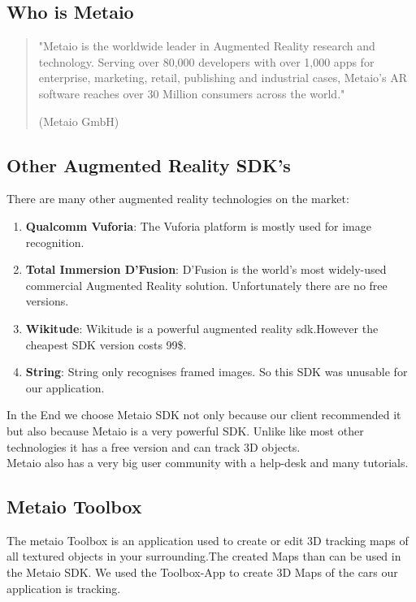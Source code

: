 \subsection{Who is Metaio}
\begin{quotation}
"Metaio is the worldwide leader in Augmented Reality research and technology. Serving over 80,000 developers with over 1,000 apps for enterprise, marketing, retail, publishing and industrial cases, Metaio's AR software reaches over 30 Million consumers across the world." 
\begin{flushright}
(Metaio GmbH)
\end{flushright}
\end{quotation}

\subsection{Other Augmented Reality SDK's}
There are many other augmented reality technologies on the market: 
\begin{enumerate}
\item \textbf{Qualcomm Vuforia}: The Vuforia platform is mostly used for image recognition.

\item \textbf{Total Immersion D'Fusion}:
D'Fusion is the world's most widely-used commercial Augmented Reality solution. Unfortunately there are no free versions.

\item \textbf{Wikitude}: Wikitude is a powerful augmented reality sdk.However the cheapest SDK version costs 99\$.

\item \textbf{String}: String only recognises framed images. So this SDK was unusable for our application.  
\end{enumerate} \cite{augmentedRealitySDk}

In the End we choose Metaio SDK not only because our client recommended it but also because Metaio is a very powerful SDK. Unlike like most other technologies it has a free version and can track 3D objects. 
\\



Metaio also has a very big user community with a help-desk and many tutorials.   
 
\subsection{Metaio Toolbox}
The metaio Toolbox is an application used to create or edit 3D tracking maps of all textured objects in your surrounding.The created Maps than can be used in the Metaio SDK. We used the Toolbox-App to create 3D Maps of the cars our application is tracking.
\\ 

